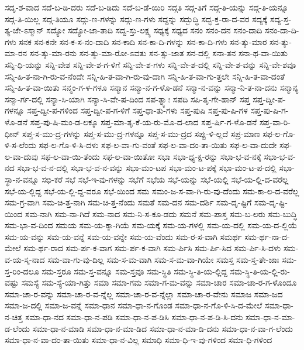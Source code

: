 {ಸದೃ-ಶ-ವಾದ
ಸದೆ-ಬ-ಡಿ-ದರು
ಸದೆ-ಬ-ಡಿದು
ಸದೆ-ಬ-ಡೆ-ಯಿರಿ
ಸದ್ಗತಿ
ಸದ್ಗ-ತಿಗೆ
ಸದ್ಗ-ತಿ-ಯನ್ನು
ಸದ್ಗ-ತಿ-ಯನ್ನೂ
ಸದ್ಗ-ತಿ-ಯಿಲ್ಲ
ಸದ್ಗ-ತಿಯೂ
ಸದ್ಗು-ಣ-ಗಳನ್ನು
ಸದ್ಗು-ಣ-ಗಳು
ಸದ್ದನ್ನು
ಸದ್ಬುದ್ಧಿ
ಸದ್ಭ-ಕ್ತ-ರಾ-ದ-ವರ
ಸದ್ಯಕ್ಕೆ
ಸದ್ಯ-ಸ್ತ-ತ್ಯ-ಜೇ-ಽಸ್ಮಾನ್
ಸದ್ಯೋ
ಸದ್ಯೋ-ಜಾ-ತಾದಿ
ಸದ್ವ-ಸ್ತು-ಲಕ್ಷ್ಯ
ಸಧ್ಯಕ್ಕೆ
ಸಧ್ಯದ
ಸನಂ
ಸನಂ-ದನ
ಸನಂ-ದಾದಿ
ಸನಂ-ದಾ-ದಿ-ಗಳು
ಸನಕ
ಸನ-ಕನೇ
ಸನ-ಕ-ಸ-ನಂ-ದಾದಿ
ಸನ-ಕಾದಿ
ಸನ-ಕಾ-ದಿ-ಗಳನ್ನು
ಸನ-ಕಾ-ದಿ-ಗಳು
ಸನ-ತ್ಕು-ಮಾರ
ಸನ-ತ್ಕು-ಮಾ-ರನ
ಸನ-ತ್ಕು-ಮಾ-ರನು
ಸನ-ತ್ಕು-ಮಾ-ರೋ-ಽವತು
ಸನ-ತ್ಸು-ಜಾತ
ಸನ-ದಲ್ಲಿ
ಸನಾ-ತನ
ಸನಾ-ಥ-ವಾ-ಯಿತು
ಸನ್ನಿ-ಧಿ-ಯನ್ನು
ಸನ್ನಿ-ವೇಶ
ಸನ್ನಿ-ವೇ-ಶ-ಗ-ಳಿಗೆ
ಸನ್ನಿ-ವೇ-ಶ-ಗಳು
ಸನ್ನಿ-ವೇ-ಶ-ದಲ್ಲಿ
ಸನ್ನಿ-ವೇ-ಶ-ವನ್ನು
ಸನ್ನಿ-ವೇ-ಶವೂ
ಸನ್ನಿ-ಹಿ-ತ-ನಾ-ಗಿ-ರು-ವ-ನೆಂದೇ
ಸನ್ನಿ-ಹಿ-ತ-ವಾ-ಗಿ-ರು-ವು-ದಾಗಿ
ಸನ್ನಿ-ಹಿ-ತ-ವಾ-ಗು-ತ್ತಲೇ
ಸನ್ನಿ-ಹಿ-ತ-ವಾ-ದಂತೆ
ಸನ್ನಿ-ಹಿ-ತ-ವಾ-ಯಿತು
ಸನ್ಮಂ-ಗ-ಳ-ಗಳೂ
ಸನ್ಮಾನ
ಸನ್ಮಾ-ನ-ಗ-ಳೊ-ಡನೆ
ಸನ್ಮಾ-ನ-ವನ್ನು
ಸನ್ಮಾ-ನಿ-ತ-ನಾ-ದನು
ಸನ್ಮಾನ್ಯ
ಸನ್ಮಾ-ರ್ಗ-ದಲ್ಲಿ
ಸನ್ಯಾ-ಸಿ-ಯಾಗಿ
ಸನ್ಯಾ-ಸಿ-ವೇ-ಷ-ದಿಂದ
ಸಪ-ತ್ನ್ಯಾಃ
ಸಪದಿ
ಸಪಿ-ತೃ-ಗೇ-ಹಾನ್
ಸಪ್ತ
ಸಪ್ತ-ದ್ವೀ-ಪ-ಗಳನ್ನೂ
ಸಪ್ತ-ದ್ವೀ-ಪ-ಗಳಿಂದ
ಸಪ್ತ-ದ್ವೀ-ಪ-ಗ-ಳಿಗೆ
ಸಪ್ತ-ಧಾ-ತು-ಗಳು
ಸಪ್ತ-ಪುಷಿ
ಸಪ್ತ-ಪು-ಷಿ-ಗಳ
ಸಪ್ತ-ಪು-ಷಿ-ಗ-ಳೊ-ಡನೆ
ಸಪ್ತ-ಪು-ಷಿ-ಮಂ-ಡ-ಲಕ್ಕೂ
ಸಪ್ತ-ಮಾ-ತೃ-ಕೆ-ಯ-ರು-ಮೊ-ದ-ಲಾದ
ಸಪ್ತ-ರ್ಷಿ-ಗ-ಳೊ-ಡನೆ
ಸಪ್ತ-ವಾ-ರಿ-ಧೀನ್
ಸಪ್ತ-ಸ-ಮು-ದ್ರ-ಗಳನ್ನು
ಸಪ್ತ-ಸ-ಮು-ದ್ರ-ಗಳನ್ನೂ
ಸಪ್ತ-ಸ-ಮು-ದ್ರದ
ಸಪ್ಪು-ಳಿ-ಲ್ಲದೆ
ಸಪ್ರ-ಮಾಣ
ಸಫ-ಲ-ಗೊ-ಳಿ-ಸ-ಲೆಂದು
ಸಫ-ಲ-ಗೊ-ಳಿ-ಸಿ-ದಳು
ಸಫ-ಲ-ವಾ-ಗು-ವಂತೆ
ಸಫ-ಲ-ವಾ-ದಂ-ತಾ-ಯಿತು
ಸಫ-ಲ-ವಾ-ದುದೇ
ಸಫ-ಲ-ವಾ-ದುವು
ಸಫ-ಲ-ವಾ-ಯಿ-ತೆಂದು
ಸಫ-ಲ-ವಾ-ಯಿತೋ
ಸಭಾ
ಸಭಾ-ಧ್ಯ-ಕ್ಷ-ರನ್ನು
ಸಭಾ-ಭ-ವ-ನಕ್ಕೆ
ಸಭಾ-ಭ-ವ-ನದ
ಸಭಾ-ಭ-ವ-ನ-ದಲ್ಲಿ
ಸಭಾ-ಭ-ವ-ನ-ವನ್ನು
ಸಭಾ-ಮಂ-ಟಪ
ಸಭಾ-ಮಂ-ಟ-ಪಕ್ಕೆ
ಸಭಾ-ಮಂ-ಟ-ಪ-ದಲ್ಲಿ
ಸಭಾ-ಸ್ಥಾ-ನ-ವನ್ನೂ
ಸಭಿ-ಕರೆ
ಸಭೆ
ಸಭೆ-ಇ-ವು-ಗಳನ್ನು
ಸಭೆಗೆ
ಸಭೆಯ
ಸಭೆ-ಯನ್ನು
ಸಭೆ-ಯಲ್ಲಿ
ಸಭೆ-ಯ-ಲ್ಲಿ-ದ-ವರೆಲ್ಲ
ಸಭೆ-ಯ-ಲ್ಲಿದ್ದ
ಸಭೆ-ಯ-ಲ್ಲಿ-ದ್ದ-ವರೂ
ಸಭೆ-ಯಿಂದ
ಸಮ
ಸಮಂ-ಜ-ಸ-ವಾ-ಗಿ-ರು-ವು-ದೆಂದು
ಸಮ-ಕಾ-ಲ-ದ-ವರೆಲ್ಲ
ಸಮ-ಗ್ರ-ವಾಗಿ
ಸಮ-ಚಿ-ತ್ತ-ನಾಗಿ
ಸಮ-ಚಿ-ತ್ತ-ನೆಂದು
ಸಮತೆ
ಸಮ-ದನ
ಸಮ-ದರ್ಶಿ
ಸಮ-ದೃ-ಷ್ಟಿಗೆ
ಸಮ-ದೃ-ಷ್ಟಿ-ಯಿಂದ
ಸಮ-ನಾಗಿ
ಸಮ-ನಾ-ಗಿದೆ
ಸಮ-ನಾದ
ಸಮ-ನಿ-ಸ-ಕೂ-ಡದು
ಸಮನೆ
ಸಮ-ಪಾಸ್ತ
ಸಮ-ಬ-ಲರು
ಸಮ-ಬುದ್ಧಿ
ಸಮ-ಭಾ-ವ-ದಿಂದ
ಸಮಯ
ಸಮ-ಯ-ಕ್ಕಾ-ಗಿಯೆ
ಸಮ-ಯಕ್ಕೆ
ಸಮ-ಯ-ಗಳಲ್ಲಿ
ಸಮ-ಯ-ದಲ್ಲಿ
ಸಮ-ಯ-ದ-ಲ್ಲಿಯೆ
ಸಮ-ಯ-ವನ್ನು
ಸಮ-ಯ-ವನ್ನೆ
ಸಮ-ಯ-ವನ್ನೇ
ಸಮ-ಯ-ವೆಂದು
ಸಮ-ರ-ಸ-ವಾಗಿ
ಸಮರ್ಥ
ಸಮ-ರ್ಥ-ನಾ-ದ-ಮೇಲೆ
ಸಮ-ರ್ಥ-ರಾದ
ಸಮ-ರ್ಪ-ಕ-ವಾಗ
ಸಮ-ರ್ಪ-ಕ-ವಾಗಿ
ಸಮ-ರ್ಪಿಸಿ
ಸಮ-ರ್ಪಿ-ಸಿದ
ಸಮ-ರ್ಪಿ-ಸಿ-ದಳು
ಸಮ-ವ-ಯ-ಸ್ಕ-ನಾದ
ಸಮ-ವಾ-ಗು-ವು-ದಿಲ್ಲ
ಸಮ-ಸ-ಮ-ವಾಗಿ
ಸಮ-ಸ-ಮ-ವಾ-ಗಿಯೇ
ಸಮಸ್ತ
ಸಮ-ಸ್ತ-ತೇ-ಜಾಃ
ಸಮ-ಸ್ತ-ರಿಂ-ದಲೂ
ಸಮ-ಸ್ತರೂ
ಸಮ-ಸ್ತ-ವನ್ನೂ
ಸಮ-ಸ್ತವೂ
ಸಮ-ಸ್ಥಿತಿ
ಸಮ-ಸ್ಥಿ-ತಿ-ಯ-ಲ್ಲಿದ್ದ
ಸಮ-ಸ್ಥಿ-ತಿ-ಯ-ಲ್ಲಿ-ರು-ವಷ್ಟು
ಸಮಸ್ಯೆ
ಸಮ-ಸ್ಯೆ-ಯಾ-ಗಿತ್ತು
ಸಮಾ
ಸಮಾ-ಗಮ
ಸಮಾ-ಗ-ಮ-ವನ್ನು
ಸಮಾ-ಚಾರ
ಸಮಾ-ಚಾ-ರ-ಗ-ಳೊಂದೂ
ಸಮಾ-ಚಾ-ರ-ವನ್ನು
ಸಮಾ-ಚಾ-ರ-ವ-ನ್ನೆಲ್ಲ
ಸಮಾ-ಚಾ-ರ-ವ-ನ್ನೆಲ್ಲಾ
ಸಮಾ-ಚಾ-ರ-ವೇನು
ಸಮಾಜ
ಸಮಾ-ಜದ
ಸಮಾ-ಜ-ದಲ್ಲಿ
ಸಮಾ-ಜ-ವನ್ನೆ
ಸಮಾ-ಧಾನ
ಸಮಾ-ಧಾ-ನ-ಗೊಂಡ
ಸಮಾ-ಧಾ-ನ-ಗೊ-ಳಿ-ಸಿ-ದ-ಮೇಲೆ
ಸಮಾ-ಧಾ-ನ-ಚಿತ್ತ
ಸಮಾ-ಧಾ-ನದ
ಸಮಾ-ಧಾ-ನ-ಪಡಿ
ಸಮಾ-ಧಾ-ನ-ಪ-ಡಿಸಿ
ಸಮಾ-ಧಾ-ನ-ಪ-ಡಿ-ಸಿ-ದನು
ಸಮಾ-ಧಾ-ನ-ಮಾ-ಡ-ಲೆಂದು
ಸಮಾ-ಧಾ-ನ-ಮಾಡಿ
ಸಮಾ-ಧಾ-ನ-ಮಾ-ಡಿದ
ಸಮಾ-ಧಾ-ನ-ಮಾ-ಡಿ-ದನು
ಸಮಾ-ಧಾ-ನ-ವಾ-ಗ-ಲೆಂದು
ಸಮಾ-ಧಾ-ನ-ವಾ-ದಂ-ತಾ-ಯಿತು
ಸಮಾ-ಧಾ-ನ-ವಿಲ್ಲ
ಸಮಾಧಿ
ಸಮಾ-ಧಿ-ಇ-ವು-ಗಳಿಂದ
ಸಮಾ-ಧಿ-ಗಳಿಂದ
}
